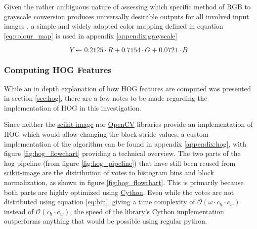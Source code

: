     Given the rather ambiguous nature of assessing which specific method of RGB to grayscale conversion produces universally desirable outputs for all involved input images \cite{madk_2008_perceptual}, a simple and widely adopted color mapping defined in equation \ref{eq:colour_map} is used in appendix \ref{appendix:grayscale}

    \begin{equation}\label{eq:colour_map}
        Y \leftarrow 0.2125 \cdot R + 0.7154 \cdot G + 0.0721 \cdot B
    \end{equation}

    \subsubsection{Computing HOG Features}

    While an in depth explanation of how HOG features are computed was presented in section \ref{sec:hog}, there are a few notes to be made regarding the implementation of HOG in this investigation.

    Since neither the \href{https://scikit-image.org/}{scikit-image} nor \href{https://opencv.org/}{OpenCV} libraries provide an implementation of HOG which would allow changing the block stride values, a custom implementation of the algorithm can be found in appendix \ref{appendix:hog}, with figure \ref{fig:hog_flowchart} providing a technical overview. The two parts of the hog pipeline (from figure \ref{fig:hog_pipeline}) that have still been reused from \href{https://scikit-image.org/}{scikit-image} are the distribution of votes to histogram bins and block normalization, as shown in figure \ref{fig:hog_flowchart}. This is primarily because both parts are highly optimized using \href{https://cython.org/}{Cython}. Even while the votes are not distributed using equation \ref{eq:bin}, giving a time complexity of $\mathcal{O}(\omega \cdot c_h \cdot c_w)$ instead of $\mathcal{O}(c_h \cdot c_w)$, the speed of the library's Cython implementation outperforms anything that would be possible using regular python.

